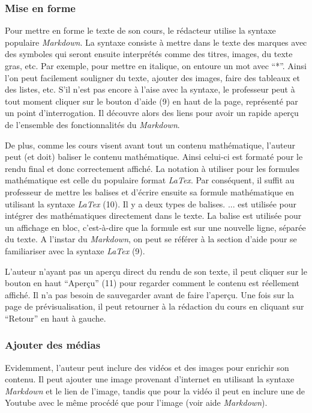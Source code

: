 \documentclass[letterpaper,10pt,oneside]{sphinxmanual}
\begin{document}
\subsubsection{Mise en forme}
\label{functionalities:mise-en-forme}
Pour mettre en forme le texte de son cours, le rédacteur utilise la syntaxe populaire \emph{Markdown}. La syntaxe consiste à mettre dans le texte des marques avec des symboles qui seront ensuite interprétés comme des titres, images, du texte gras, etc. Par exemple, pour mettre en italique, on entoure un mot avec ``*''. Ainsi l'on peut facilement souligner du texte, ajouter des images, faire des tableaux et des listes, etc. S'il n'est pas encore à l'aise avec la syntaxe, le professeur peut à tout moment cliquer sur le bouton d'aide (9) en haut de la page, représenté par un point d'interrogation. Il découvre alors des liens pour avoir un rapide aperçu de l'ensemble des fonctionnalités du \emph{Markdown}.

De plus, comme les cours visent avant tout un contenu mathématique, l'auteur peut (et doit) baliser le contenu mathématique. Ainsi celui-ci est formaté pour le rendu final et donc correctement affiché. La notation à utiliser pour les formules mathématique est celle du populaire format \emph{LaTex}. Par conséquent, il suffit au professeur de mettre les balises et d'écrire ensuite sa formule mathématique en utilisant la syntaxe \emph{LaTex} (10). Il y a deux types de balises. \code{\textbackslash{}(} ... \code{\textbackslash{})} est utilisée pour intégrer des mathématiques directement dans le texte. La balise \code{\textbar{}\textbar{}} est utilisée pour un affichage en bloc, c'est-à-dire que la formule est sur une nouvelle ligne, séparée du texte. A l'instar du \emph{Markdown}, on peut se référer à la section d'aide pour se familiariser avec la syntaxe \emph{LaTex} (9).

L'auteur n'ayant pas un aperçu direct du rendu de son texte, il peut cliquer sur le bouton en haut ``Aperçu'' (11) pour regarder comment le contenu est réellement affiché. Il n'a pas besoin de sauvegarder avant de faire l'aperçu. Une fois sur la page de prévisualisation, il peut retourner à la rédaction du cours en cliquant sur ``Retour'' en haut à gauche.


\subsubsection{Ajouter des médias}
\label{functionalities:ajouter-des-medias}
Evidemment, l'auteur peut inclure des vidéos et des images pour enrichir son contenu. Il peut ajouter une image provenant d'internet en utilisant la syntaxe \emph{Markdown} et le lien de l'image, tandis que pour la vidéo il peut en inclure une de Youtube avec le même procédé que pour l'image (voir aide \emph{Markdown}).
\end{document}

